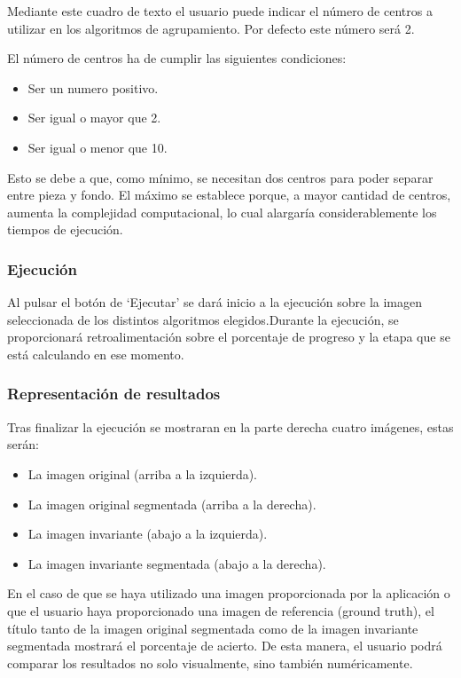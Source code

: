 Mediante este cuadro de texto el usuario puede indicar el número de centros a utilizar en los algoritmos de agrupamiento. Por defecto este número será 2.

El número de centros ha de cumplir las siguientes condiciones:

\begin{itemize}
    \item Ser un numero positivo.
    \item Ser igual o mayor que 2.
    \item Ser igual o menor que 10.
\end{itemize}

Esto se debe a que, como mínimo, se necesitan dos centros para poder separar entre pieza y fondo. El máximo se establece porque, a mayor cantidad de centros, aumenta la complejidad computacional, lo cual alargaría considerablemente los tiempos de ejecución.

\subsubsection{Ejecución}\label{ejecución}

Al pulsar el botón de `Ejecutar' se dará inicio a la ejecución sobre la imagen seleccionada de los distintos algoritmos elegidos.Durante la ejecución, se proporcionará retroalimentación sobre el porcentaje de progreso y la etapa que se está calculando en ese momento.

\subsubsection{Representación de resultados}\label{representación-de-resultados}

Tras finalizar la ejecución se mostraran en la parte derecha cuatro imágenes, estas serán:

\begin{itemize}
    \item La imagen original (arriba a la izquierda).
    \item La imagen original segmentada (arriba a la derecha).
    \item La imagen invariante (abajo a la izquierda).
    \item La imagen invariante segmentada (abajo a la derecha).
\end{itemize}

En el caso de que se haya utilizado una imagen proporcionada por la aplicación o que el usuario haya proporcionado una imagen de referencia (ground truth), el título tanto de la imagen original segmentada como de la imagen invariante segmentada mostrará el porcentaje de acierto. De esta manera, el usuario podrá comparar los resultados no solo visualmente, sino también numéricamente.

